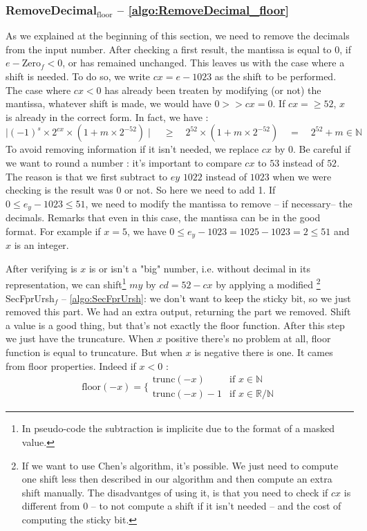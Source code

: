 \documentclass[runningheads]{llncs}
\begin{document}
    \subsubsection{RemoveDecimal$_\text{floor}$ -- \autoref{algo:RemoveDecimal_floor}}
    As we explained at the beginning of this section, we need to remove the decimals from the input number.
    After checking a first result, the mantissa is equal to 0, if $e-\text{Zero}_f<0$, or has remained unchanged.
    This leaves us with the case where a shift is needed. To do so, we write $cx = e - 1023$ as the shift to be performed.
    The case where $cx<0$ has already been treaten by modifying (or not) the mantissa, whatever shift is made, we would have $0>>cx = 0$.
    If $cx=\geq52$, $x$ is already in the correct form. In fact, we have : 
    $$\mid (-1)^s \times 2^{cx} \times(1+m\times 2^{-52})\mid \quad \geq \quad 2^{52} \times(1+m\times 2^{-52})\quad = \quad2^{52} + m \in \mathbb{N}$$
    To avoid removing information if it isn't needed, we replace $cx$ by $0$.
    Be careful if we want to round a number : it's important to compare $cx$ to $53$ instead of $52$. The reason is that we first subtract to $ey$ $1022$ instead of $1023$ when we were checking is the result was 0 or not. So here we need to add 1.
    If $0\leq e_y - 1023 \leq 51$, we need to modify the mantissa to remove -- if necessary-- the decimals.
    Remarks that even in this case, the mantissa can be in the good format. For example if $x = 5$, we have $0\leq e_y-1023 = 1025-1023 = 2 \leq 51$ and $x$ is an integer.
    
    After verifying is $x$ is or isn't a "big" number, i.e. without decimal in its representation, we can shift\footnote{
    In pseudo-code the subtraction is implicite due to the format of a masked value.} $my$ by $cd=52-cx$ by applying a modified \footnote{If
    we want to use Chen's algorithm, it's possible. We just need to compute one shift less then described in our algorithm and then compute an extra shift manually. The disadvantges of using it, is that you need to check if $cx$ is different from $0$ 
    -- to not compute a shift if it isn't needed -- and the cost of computing the sticky bit.} SecFprUrsh$_f$ -- \autoref{algo:SecFprUrsh}: 
    we don't want to keep the sticky bit, so we just removed this part.
    We had an extra output, returning the part we removed.
    Shift a value is a good thing, but that's not exactly the floor function. After this step we just have the truncature.
    When $x$ positive there's no problem at all, floor function is equal to truncature. But when $x$ is negative there is one. It cames from floor properties. Indeed if $x<0$ : 
    \begin{equation}
        \label{eq:floorneg}
        \text{floor}(-x)  = \Bigg\{ \begin{array}{cc}
            \text{trunc}(-x) &  \text{if } x\in\mathbb{N}\\
            \text{trunc}(-x) -1 &  \text{if } x\in\mathbb{R}/\mathbb{N}
         \end{array}
    \end{equation}
\end{document}
